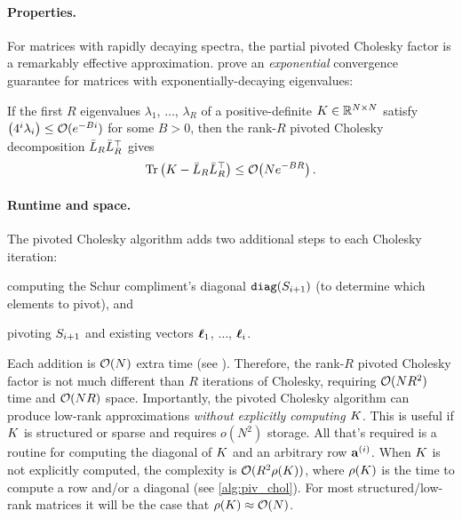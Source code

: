 \paragraph{Properties.}
For matrices with rapidly decaying spectra, the partial pivoted Cholesky factor is a remarkably effective approximation.
\citet{harbrecht2012low} prove an \emph{exponential} convergence guarantee for matrices with exponentially-decaying eigenvalues:
%
\begin{theorem}
\label{thm:harbrecht}
  If the first $R$ eigenvalues $\lambda_1$, $\ldots$, $\lambda_R$ of a positive-definite $K \in \mathbb{R}^{N \times N}$ satisfy $\left( 4^{i}\lambda_{i} \right) \leq \bigo{e^{-Bi}}$ for some $B>0$,
  then the rank-$R$ pivoted Cholesky decomposition $\bar{L}_{R} \bar{L}_R^\top$ gives
  \[
    \tr{\bK -  \bar\bL_R \bar\bL_R^\top} \leq \bigo{N e^{-BR}}.
  \]
\end{theorem}


\paragraph{Runtime and space.}
The pivoted Cholesky algorithm adds two additional steps to each Cholesky iteration:
%
\begin{enumerate*}
  \item computing the Schur compliment's diagonal $\texttt{diag}(S_{i+1})$ (to determine which elements to pivot), and
  \item pivoting $S_{i+1}$ and existing vectors $\boldsymbol{\ell}_1$, $\ldots$, $\boldsymbol{\ell}_i$.
\end{enumerate*}
%
Each addition is $\bigo{N}$ extra time (see \citep[][Thm. 1]{harbrecht2012low}).
Therefore, the rank-$R$ pivoted Cholesky factor is not much different than $R$ iterations of Cholesky, requiring $\bigo{N R^2}$ time and $\bigo{NR}$ space.
Importantly, the pivoted Cholesky algorithm can produce low-rank approximations \emph{without explicitly computing $K$}.
This is useful if $K$ is structured or sparse and requires $o(N^2)$ storage.
All that's required is a routine for computing the diagonal of $K$ and an arbitrary row $\mathbf{a}^{(i)}$.
When $K$ is not explicitly computed, the complexity is $\bigo{R^2 \row{\bK}}$, where $\rho ( K )$ is the time to compute a row and/or a diagonal (see \cref{alg:piv_chol}).
For most structured/low-rank matrices it will be the case that $\row{\bK} \approx \bigo{N}$.



\clearpage
